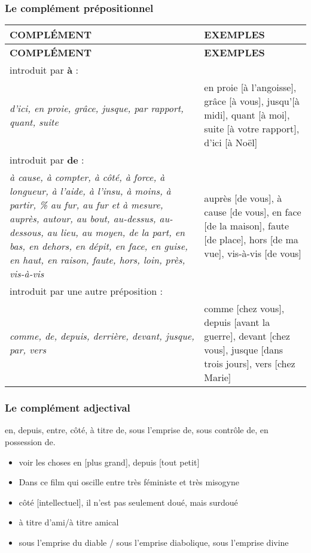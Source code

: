 \documentclass[UTF8]{report}
\begin{document}
\subsubsection{Le complément prépositionnel}
\begin{longtable}{|m{7cm}|m{8cm}|}
\hline
\textbf{COMPLÉMENT} & \textbf{EXEMPLES} \\
\hline
\endfirsthead
\hline
\textbf{COMPLÉMENT} & \textbf{EXEMPLES} \\
\hline
\endhead
\hline
\endfoot
\hline
\endlastfoot

introduit par \textbf{à} : & \\
\textit{d'ici, en proie, grâce, jusque, par rapport, quant, suite} & en proie [à l'angoisse], grâce [à vous], jusqu'[à midi], quant [à moi], suite [à votre rapport], d'ici [à Noël] \\
\hline
introduit par \textbf{de} : & \\
\textit{à cause, à compter, à côté, à force, à longueur, à l'aide, à l'insu, à moins, à partir, \% au fur, au fur et à mesure, auprès, autour, au bout, au-dessus, au-dessous, au lieu, au moyen, de la part, en bas, en dehors, en dépit, en face, en guise, en haut, en raison, faute, hors, loin, près, vis-à-vis} & auprès [de vous], à cause [de vous], en face [de la maison], faute [de place], hors [de ma vue], vis-à-vis [de vous] \\
\hline
introduit par une autre préposition : & \\
\textit{comme, de, depuis, derrière, devant, jusque, par, vers} & comme [chez vous], depuis [avant la guerre], devant [chez vous], jusque [dans trois jours], vers [chez Marie] \\
\hline
\end{longtable}


\subsubsection{Le complément adjectival }
en, depuis, entre, côté, à titre de, sous l’emprise de, sous contrôle de, en possession de.
\begin{itemize}
    \item voir les choses en [plus grand], depuis [tout petit]
    \item Dans ce film qui oscille entre très féministe et très misogyne
    \item côté [intellectuel], il n’est pas seulement doué, mais surdoué
    \item à titre d’ami/à titre amical
    \item sous l’emprise du diable / sous l’emprise diabolique, sous l’emprise divine
\end{itemize}
\end{document}
